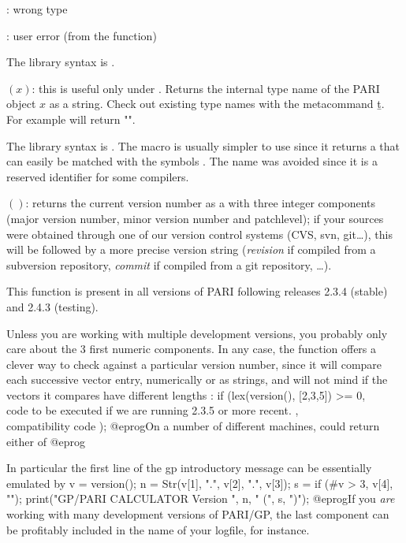 : wrong type

: user error (from the  function)

The library syntax is .

$(x)$: \label{se:type}this is useful only under . Returns the internal type name of
the PARI object $x$ as a  string. Check out existing type names with the
metacommand \b{t}. For example  will return "".

The library syntax is .
The macro  is usually simpler to use since it returns a
 that can easily be matched with the symbols \typ{*}. The name
 was avoided since it is a reserved identifier for some compilers.

$()$: \label{se:version}returns the current version number as a  with three integer
components (major version number, minor version number and patchlevel);
if your
sources were obtained through one of our version control systems (CVS, svn,
git\dots), this will be followed by a more precise version string
(\emph{revision} if compiled from a subversion repository,
\emph{commit} if compiled from a git repository, \dots).

This function is present in all versions of PARI following releases 2.3.4
(stable) and 2.4.3 (testing).

Unless you are working with multiple development versions, you probably only
care about the 3 first numeric components. In any case, the  function
offers a clever way to check against a particular version number, since it will
compare each successive vector entry, numerically or as strings, and will not
mind if the vectors it compares have different lengths :
\bprog
   if (lex(version(), [2,3,5]) >= 0,
     \\ code to be executed if we are running 2.3.5 or more recent.
   ,
     \\ compatibility code
   );
@eprog\noindent On a number of different machines,  could return either of
\bprog
@eprog

In particular the first line of the gp introductory message can be essentially
emulated by
\bprog
   v = version();
   n = Str(v[1], ".", v[2], ".", v[3]);
   s = if (#v > 3, v[4], "");
   print("GP/PARI CALCULATOR Version ", n, " (", s, ")");
 @eprog\noindent If you \emph{are} working with many development versions of
 PARI/GP, the last component can be profitably included in the name of
 your logfile, for instance.

